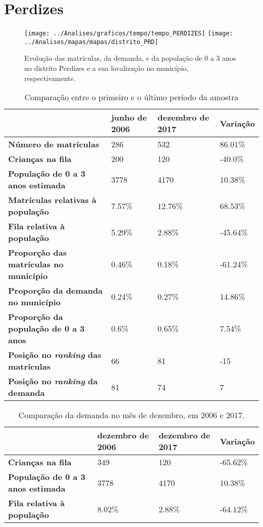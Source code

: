 \section{Perdizes}
\begin{figure}[H]
\centering
\texttt{[image: ../Analises/graficos/tempo/tempo\_PERDIZES]}
\texttt{[image: ../Analises/mapas/mapas/distrito\_PRD]}
\caption{Evolução das matrículas, da demanda, e da população de 0 a 3 anos no distrito Perdizes e a sua localização no município, respectivamente.}
\end{figure}
\begin{table}[H]
\begin{tabular}{l|l|l|l}
\textbf{}                                      & \textbf{junho de 2006}       & \textbf{dezembro de 2017}    & \textbf{Variação} \\ \hline
\textbf{Número de matrículas}                  & 286 & 532 & 86.01\% \\ \hline
\textbf{Crianças na fila}                      & 200 & 120 & -40.0\% \\ \hline
\textbf{População de 0 a 3 anos estimada}      & 3778 & 4170 & 10.38\% \\ \hline
\textbf{Matrículas relativas à população}      & 7.57\% & 12.76\% & 68.53\% \\ \hline
\textbf{Fila relativa à população}             & 5.29\% & 2.88\% & -45.64\% \\ \hline
\textbf{Proporção das matrículas no município} & 0.46\% & 0.18\% & -61.24\% \\ \hline
\textbf{Proporção da demanda no município}     & 0.24\% & 0.27\% & 14.86\% \\ \hline
\textbf{Proporção da população de 0 a 3 anos}  & 0.6\% & 0.65\% & 7.54\% \\ \hline
\textbf{Posição no \textit{ranking} das matrículas}     & 66 & 81 & -15 \\ \hline
\textbf{Posição no \textit{ranking} da demanda}         & 81 & 74 & 7 \\ 
\end{tabular}
\caption{Comparação entre o primeiro e o último período da amostra}
\end{table}
\begin{table}[H]
\begin{tabular}{l|l|l|l}
\textbf{}                                 & \textbf{dezembro de 2006} & \textbf{dezembro de 2017} & \textbf{Variação} \\ \hline
\textbf{Crianças na fila}                      & 349 & 120 & -65.62\% \\ \hline
\textbf{População de 0 a 3 anos estimada}      & 3778 & 4170 & 10.38\% \\ \hline
\textbf{Fila relativa à população}             & 8.02\% & 2.88\% & -64.12\% \\
\end{tabular}
\caption{Comparação da demanda no mês de dezembro, em 2006 e 2017.}
\end{table}

